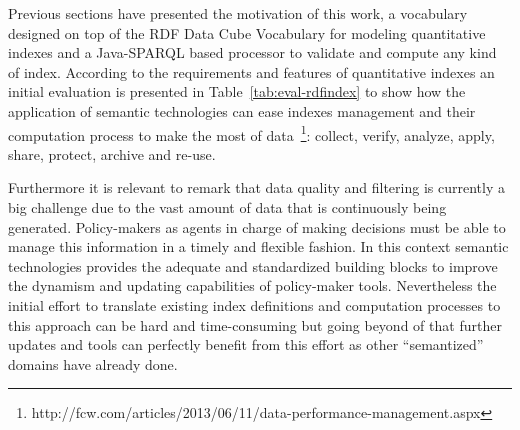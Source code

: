 Previous sections have presented the motivation of this work, a vocabulary designed on top of the 
RDF Data Cube Vocabulary for modeling quantitative indexes and a Java-SPARQL based processor 
to validate and compute any kind of index. According to the requirements and features 
of quantitative indexes an initial evaluation is presented in Table~\ref{tab:eval-rdfindex} to show how the application of semantic technologies can ease indexes management and their computation process 
to make the most of data~\footnote{http://fcw.com/articles/2013/06/11/data-performance-management.aspx}: 
collect, verify, analyze, apply, share, protect, archive and re-use.

Furthermore it is relevant to remark that data quality and filtering is currently a big challenge 
due to the vast amount of data that is continuously being generated. Policy-makers as agents in charge 
of making decisions must be able to manage this information in a timely and flexible fashion. In this context semantic technologies provides the adequate and standardized building blocks to improve the dynamism and updating capabilities of policy-maker tools. Nevertheless 
the initial effort to translate existing index definitions and computation processes to this approach can 
be hard and time-consuming but going beyond of that further updates and tools can perfectly benefit from this effort as 
other ``semantized'' domains have already done. 


